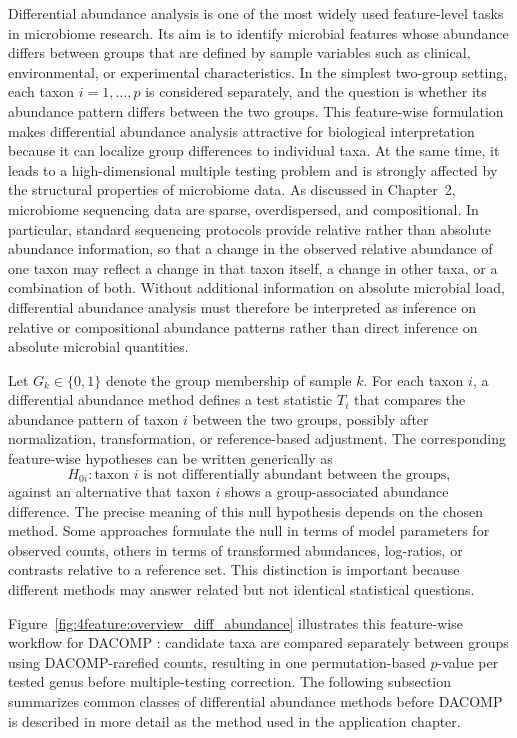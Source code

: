 Differential abundance analysis is one of the most widely used feature-level tasks in microbiome research. Its aim is to identify microbial features whose abundance differs between groups that are defined by sample variables such as clinical, environmental, or experimental characteristics. In the simplest two-group setting, each taxon $i = 1, \ldots, p$ is considered separately, and the question is whether its abundance pattern differs between the two groups. This feature-wise formulation makes differential abundance analysis attractive for biological interpretation because it can localize group differences to individual taxa. At the same time, it leads to a high-dimensional multiple testing problem and is strongly affected by the structural properties of microbiome data. As discussed in Chapter~2, microbiome sequencing data are sparse, overdispersed, and compositional. In particular, standard sequencing protocols provide relative rather than absolute abundance information, so that a change in the observed relative abundance of one taxon may reflect a change in that taxon itself, a change in other taxa, or a combination of both. Without additional information on absolute microbial load, differential abundance analysis must therefore be interpreted as inference on relative or compositional abundance patterns rather than direct inference on absolute microbial quantities.

Let $G_k \in \{0,1\}$ denote the group membership of sample $k$. For each taxon $i$, a differential abundance method defines a test statistic $T_i$ that compares the abundance pattern of taxon $i$ between the two groups, possibly after normalization, transformation, or reference-based adjustment. The corresponding feature-wise hypotheses can be written generically as
\begin{equation}
	H_{0i}: \text{taxon } i \text{ is not differentially abundant between the groups},
\end{equation}
against an alternative that taxon $i$ shows a group-associated abundance difference. The precise meaning of this null hypothesis depends on the chosen method. Some approaches formulate the null in terms of model parameters for observed counts, others in terms of transformed abundances, log-ratios, or contrasts relative to a reference set. This distinction is important because different methods may answer related but not identical statistical questions.

Figure~\ref{fig:4feature:overview_diff_abundance} illustrates this feature-wise workflow for DACOMP \citep{brill2022testing}: candidate taxa are compared separately between groups using DACOMP-rarefied counts, resulting in one permutation-based $p$-value per tested genus before multiple-testing correction.
The following subsection summarizes common classes of differential abundance methods before DACOMP is described in more detail as the method used in the application chapter.

